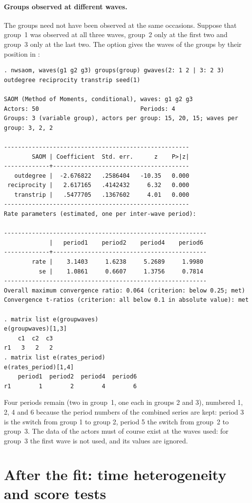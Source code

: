 \paragraph{Groups observed at different waves.} The groups need not have been observed at the same occasions. Suppose that group~1 was observed at all three waves, group~2 only at the first two and group~3 only at the last two. The option  gives the waves of the groups by their position in :
\begin{lstlisting}
. nwsaom, waves(g1 g2 g3) groups(group) gwaves(2: 1 2 | 3: 2 3) outdegree reciprocity transtrip seed(1)

SAOM (Method of Moments, conditional), waves: g1 g2 g3
Actors: 50                             Periods: 4
Groups: 3 (variable group), actors per group: 15, 20, 15; waves per group: 3, 2, 2

-----------------------------------------------------
        SAOM | Coefficient  Std. err.      z    P>|z|
-------------+---------------------------------------
   outdegree |  -2.676822   .2586404   -10.35   0.000
 reciprocity |   2.617165   .4142432     6.32   0.000
   transtrip |   .5477705   .1367602     4.01   0.000
-----------------------------------------------------
Rate parameters (estimated, one per inter-wave period):

----------------------------------------------------------
             |   period1    period2    period4    period6
-------------+--------------------------------------------
        rate |    3.1403     1.6238     5.2689     1.9980
          se |    1.0861     0.6607     1.3756     0.7814
----------------------------------------------------------
Overall maximum convergence ratio: 0.064 (criterion: below 0.25; met)
Convergence t-ratios (criterion: all below 0.1 in absolute value): met

. matrix list e(groupwaves)
e(groupwaves)[1,3]
    c1  c2  c3
r1   3   2   2
. matrix list e(rates_period)
e(rates_period)[1,4]
    period1  period2  period4  period6
r1        1        2        4        6
\end{lstlisting}
Four periods remain (two in group~1, one each in groups 2 and 3), numbered 1, 2, 4 and 6 because the period numbers of the combined series are kept: period 3 is the switch from group 1 to group 2, period 5 the switch from group~2 to group~3. The data of the actors must of course exist at the waves used: for group~3 the first wave is not used, and its values are ignored.

\section{After the fit: time heterogeneity and score tests}\label{sec:groups-after}

